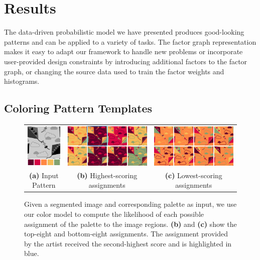 \section{Results}
\label{sec:results}

The data-driven probabilistic model we have presented produces good-looking patterns and can be applied to a variety of tasks. The factor graph representation makes it easy to adapt our framework to handle new problems or incorporate user-provided design constraints by introducing additional factors to the factor graph, or changing the source data used to train the factor weights and histograms.



\subsection{Coloring Pattern Templates}

\begin{figure}[ht]
\begin{tabular}{ccc}
\includegraphics[width=.15\linewidth]{figs/permutationTemplatePalette} & \includegraphics[width=.4\linewidth]{figs/permutationBest8} & \includegraphics[width=.4\linewidth]{figs/permutationWorst8} %
  \\
\textbf{(a)} Input Pattern & \textbf{(b)} Highest-scoring assignments & \textbf{(c)} Lowest-scoring assignments %
\\
\end{tabular}

\caption{Given a segmented image and corresponding palette as input, we use our color model to compute the likelihood of each possible assignment of the palette to the image regions. \textbf{(b)} and \textbf{(c)} show the top-eight and bottom-eight assignments. The assignment provided by the artist received the second-highest score and is highlighted in blue.}
\label{fig:permutation}
\end{figure}


